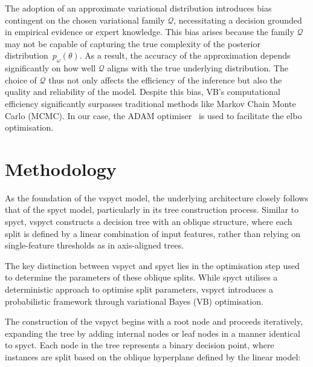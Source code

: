 \documentclass[3p,review,authoryear]{elsarticle}
\begin{document}
The adoption of an approximate variational distribution introduces bias contingent on the chosen variational family $\mathcal{Q}$, necessitating a decision grounded in empirical evidence or expert knowledge.
This bias arises because the family \(\mathcal{Q}\) may not be capable of capturing the true complexity of the posterior distribution~\(p_\omega(\theta)\).
As a result, the accuracy of the approximation depends significantly on how well \(\mathcal{Q}\) aligns with the true underlying distribution.
The choice of \(\mathcal{Q}\) thus not only affects the efficiency of the inference but also the quality and reliability of the model.
Despite this bias, VB's computational efficiency significantly surpasses traditional methods like Markov Chain Monte Carlo (MCMC).
In our case, the ADAM optimiser~\citep{kingma2014adam} is used to facilitate the \gls{elbo} optimisation.


\section{Methodology}

As the foundation of the \gls{vspyct} model, the underlying architecture closely follows that of the \gls{spyct} model, particularly in its tree construction process.
Similar to \gls{spyct}, \gls{vspyct} constructs a decision tree with an oblique structure, where each split is defined by a linear combination of input features, rather than relying on single-feature thresholds as in axis-aligned trees.

The key distinction between \gls{vspyct} and \gls{spyct} lies in the optimisation step used to determine the parameters of these oblique splits.
While \gls{spyct} utilises a deterministic approach to optimise split parameters, \gls{vspyct} introduces a probabilistic framework through variational Bayes (VB) optimisation.

The construction of the \gls{vspyct} begins with a root node and proceeds iteratively, expanding the tree by adding internal nodes or leaf nodes in a manner identical to \gls{spyct}. Each node in the tree represents a binary decision point, where instances are split based on the oblique hyperplane defined by the linear model:
\end{document}
